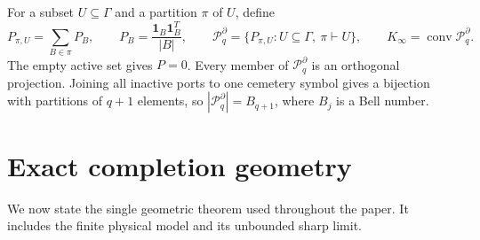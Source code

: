 \documentclass[journal,10pt]{IEEEtran}
\theoremstyle{definition}
\theoremstyle{remark}
\newcommand{\one}{\mathbf 1}
\newcommand{\conv}{\operatorname{conv}}
\newcommand{\cP}{\mathcal P}
\begin{document}
For a subset $U\subseteq\Gamma$ and a partition $\pi$ of $U$, define
\begin{equation}
  P_{\pi,U}=\sum_{B\in\pi}P_B,
  \qquad P_B=\frac{\one_B\one_B^T}{|B|},
  \qquad
  \cP_q^\partial=\{P_{\pi,U}:U\subseteq\Gamma,\ \pi\vdash U\},
  \qquad K_\infty=\conv\cP_q^\partial .
  \label{eq:partial-scenarios}
\end{equation}
The empty active set gives $P=0$.  Every member of $\cP_q^\partial$ is an
orthogonal projection.  Joining all inactive ports to one cemetery symbol
gives a bijection with partitions of $q+1$ elements, so
$|\cP_q^\partial|=B_{q+1}$, where $B_j$ is a Bell number.

\section{Exact completion geometry}

We now state the single geometric theorem used throughout the paper.  It
includes the finite physical model and its unbounded sharp limit.
\end{document}
